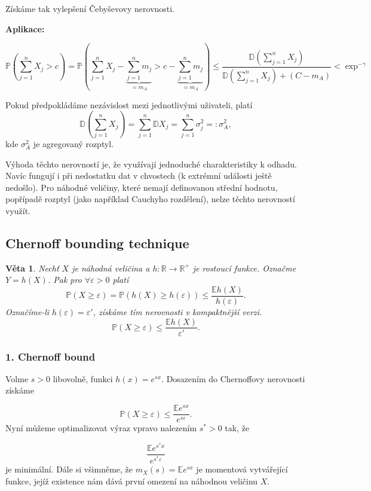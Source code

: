 \documentclass{article}
\newtheorem{theorem}[subsubsection]{Věta}
\theoremstyle{remark}
\theoremstyle{plain}
\theoremstyle{definition}
\theoremstyle{remark}
\begin{document}
Získáme tak vylepšení Čebyševovy nerovnosti.

\textbf{Aplikace:}

$$
\mathbb{P}\left( \sum_{j=1}^{n} X_j > c \right) = \mathbb{P} \left( \sum_{j=1}^{n} X_j - \underbrace{\sum_{j=1}^{n} m_j}_{=m_A} > c - \underbrace{\sum_{j=1}^{n}m_j}_{=m_A}\right) \leq \frac{\mathbb{D}\left( \sum_{j=1}^{n} X_j\right)}{\mathbb{D}\left( \sum_{j=1}^{n} X_j\right) + \left(C - m_A\right)} < \exp^{-\gamma}
$$

Pokud předpokládáme nezávislost mezi jednotlivými uživateli, platí
$$
\mathbb{D}\left( \sum_{j=1}^{n} X_j\right) = \sum_{j=1}^{n}\mathbb{D} X_j = 
\sum_{j=1}^{n}\sigma_j^{2} =: \sigma_A^{2}, 
$$
kde $\sigma_A^{2}$ je agregovaný rozptyl.

Výhoda těchto nerovností je, že využívají jednoduché charakteristiky k odhadu. Navíc fungují i při nedostatku dat v chvostech (k extrémní události ještě nedošlo). Pro náhodné veličiny, které nemají definovanou střední hodnotu, popřípadě rozptyl (jako například Cauchyho rozdělení), nelze těchto nerovností využít.

\subsection{Chernoff bounding technique}
\begin{theorem}
Nechť $X$ je náhodná veličina a $h: \mathbb{R} \to \mathbb{R}^{+}$ je rostoucí funkce. Označme $Y = h(X)$. Pak pro $\forall \varepsilon > 0$ platí 
$$
\mathbb{P}\left(X \geq \varepsilon \right)  = \mathbb{P}\left(h(X) \geq h(\varepsilon) \right) \leq \frac{\mathbb{E} h(X)}{h(\varepsilon)}.
$$
Označíme-li $h(\varepsilon) = \varepsilon'$, získáme tím nerovnosti v kompaktnější verzi.
$$
\mathbb{P}\left(X \geq \varepsilon \right) \leq \frac{\mathbb{E} h(X)}{\varepsilon'}.
$$
\end{theorem}

\subsubsection{1. Chernoff bound}

Volme $s > 0$ libovolně, funkci $h(x) = e^{sx}$. Dosazením do Chernoffovy nerovnosti získáme

$$
\mathbb{P}\left(X \geq \varepsilon \right) \leq \frac{\mathbb{E}e^{sx}}{e^{s\varepsilon}}.
$$
Nyní můžeme optimalizovat výraz vpravo nalezením $s^{*} > 0$ tak, že

$$
\frac{\mathbb{E}e^{s^{*}x}}{e^{s^{*}\varepsilon}}
$$
je minimální. Dále si všimněme, že $m_X(s) = \mathbb{E}e^{sx}$ je momentová vytvářející funkce, jejíž existence nám dává první omezení na náhodnou veličinu $X$.
\end{document}
